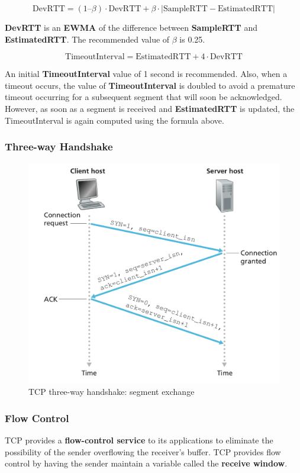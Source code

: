 \documentclass[11pt]{article}
\begin{document}
\[
	\mathrm{DevRTT} = (1– \beta) \cdot \mathrm{DevRTT} + \beta \cdot | \mathrm{SampleRTT} - \mathrm{EstimatedRTT} |
\]

\textbf{DevRTT} is an \textbf{EWMA} of the difference between \textbf{SampleRTT} and \textbf{EstimatedRTT}. The recommended value of $\beta$ is 0.25.

\[
	\mathrm{TimeoutInterval} = \mathrm{EstimatedRTT} + 4 \cdot \mathrm{DevRTT}
\]

An initial \textbf{TimeoutInterval} value of 1 second is recommended. Also, when a timeout occurs, the value of \textbf{TimeoutInterval} is doubled to avoid a premature timeout occurring for a subsequent segment that will soon be acknowledged. However, as soon as a segment is received and \textbf{EstimatedRTT} is updated, the TimeoutInterval is again computed using the formula above.

\subsubsection{Three-way Handshake}

\begin{figure}[h]
	\centering
	\includegraphics[width=0.6\linewidth]{images/Three-wayHandshake.png}
	\caption{TCP three-way handshake: segment exchange}
	\label{fig:Three-wayHandshake}
\end{figure}

\subsubsection{Flow Control}

TCP provides a \textbf{flow-control service} to its applications to eliminate the possibility of the sender overflowing the receiver’s buffer. TCP provides flow control by having the sender maintain a variable called the \textbf{receive window}.
\end{document}

